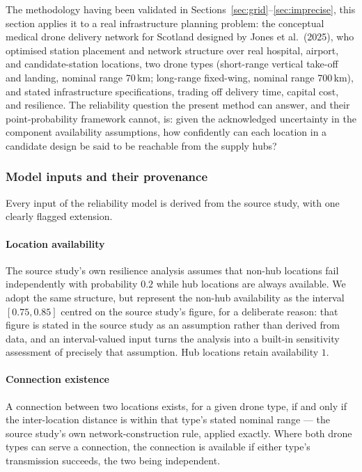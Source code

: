 \documentclass[preprint,12pt]{elsarticle}
\theoremstyle{definition}
\begin{document}
The methodology having been validated in Sections~\ref{sec:grid}--\ref{sec:imprecise}, this section
applies it to a real infrastructure planning problem: the conceptual medical drone delivery network for
Scotland designed by Jones et al.\ (2025), who optimised station placement and network structure over
real hospital, airport, and candidate-station locations, two drone types (short-range vertical take-off
and landing, nominal range 70\,km; long-range fixed-wing, nominal range 700\,km), and stated
infrastructure specifications, trading off delivery time, capital cost, and resilience. The reliability
question the present method can answer, and their point-probability framework cannot, is: given the
acknowledged uncertainty in the component availability assumptions, how confidently can each location in
a candidate design be said to be reachable from the supply hubs?

\subsubsection{Model inputs and their provenance}\label{sec:provenance}

Every input of the reliability model is derived from the source study, with one clearly flagged
extension.

\paragraph{Location availability} The source study's own resilience analysis assumes that non-hub
locations fail independently with probability $0.2$ while hub locations are always available. We adopt
the same structure, but represent the non-hub availability as the interval $[0.75,0.85]$ centred on the
source study's figure, for a deliberate reason: that figure is stated in the source study as an
assumption rather than derived from data, and an interval-valued input turns the analysis into a
built-in sensitivity assessment of precisely that assumption. Hub locations retain availability $1$.

\paragraph{Connection existence} A connection between two locations exists, for a given drone type, if
and only if the inter-location distance is within that type's stated nominal range --- the source
study's own network-construction rule, applied exactly. Where both drone types can serve a connection,
the connection is available if either type's transmission succeeds, the two being independent.
\end{document}

